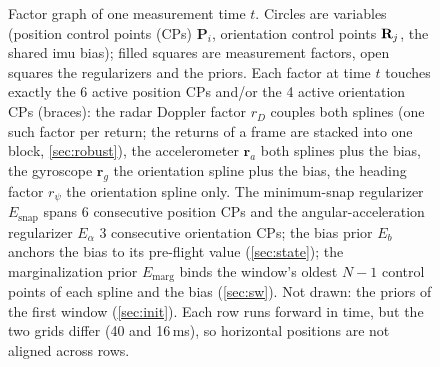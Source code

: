 \begin{figure}[t]
\caption{Factor graph of one measurement time $t$.
Circles are variables (position control points (CPs) $\mathbf{P}_i$,
orientation control points $\mathbf{R}_j$, the shared \ac{imu} bias); filled squares
are measurement factors, open squares the regularizers and the
priors.  Each factor at time $t$ touches exactly the 6
active position CPs and/or the 4 active orientation CPs (braces): the
radar Doppler factor $r_D$ couples both splines (one such factor per
return; the returns of a frame are stacked into one block,
\autoref{sec:robust}), the accelerometer $\mathbf{r}_a$ both splines
plus the bias, the gyroscope $\mathbf{r}_g$ the orientation spline plus
the bias, the heading factor $r_\psi$ the orientation spline only.  The
minimum-snap regularizer $E_{\mathrm{snap}}$ spans 6 consecutive position CPs
and the angular-acceleration regularizer $E_\alpha$ 3 consecutive
orientation CPs; the bias prior $E_b$ anchors the bias to its pre-flight value
(\autoref{sec:state}); the marginalization prior $E_{\mathrm{marg}}$
binds the window's oldest $N{-}1$ control points of each spline and the bias
(\autoref{sec:sw}).  Not drawn: the priors of the first window (\autoref{sec:init}).  Each row
runs forward in time, but the two grids differ (40 and 16\,ms), so
horizontal positions are not aligned across rows.}
\label{fig:factorgraph}
\end{figure}

